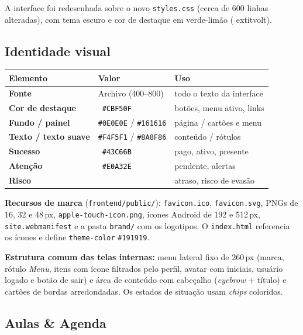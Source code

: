 \documentclass[11pt,a4paper]{article}
\newcommand{\cod}[1]{\texttt{#1}}
\begin{document}
A interface foi redesenhada sobre o novo \cod{styles.css} (cerca de 600 linhas alteradas), com
tema escuro e cor de destaque em verde-limão (	extit{volt}).

\subsection{Identidade visual}

\begin{center}
\begin{tabular}{>{\bfseries}l l l}
  \toprule
  Elemento & Valor & Uso \\
  \midrule
  Fonte                 & Archivo (400--800)                 & todo o texto da interface \\
  Cor de destaque       & \colorbox[HTML]{CBF50F}{\textcolor{black}{\ \cod{\#CBF50F}\ }} & botões, menu ativo, links \\
  Fundo / painel        & \cod{\#0E0E0E} / \cod{\#161616}    & página / cartões e menu \\
  Texto / texto suave   & \cod{\#F4F5F1} / \cod{\#8A8F86}    & conteúdo / rótulos \\
  Sucesso               & \colorbox[HTML]{43C66B}{\textcolor{black}{\ \cod{\#43C66B}\ }} & pago, ativo, presente \\
  Atenção               & \colorbox[HTML]{E0A32E}{\textcolor{black}{\ \cod{\#E0A32E}\ }} & pendente, alertas \\
  Risco                 & \colorbox[HTML]{F0493C}{\textcolor{white}{\ \cod{\#F0493C}\ }} & atraso, risco de evasão \\
  \bottomrule
\end{tabular}
\end{center}

\textbf{Recursos de marca} (\cod{frontend/public/}): \cod{favicon.ico}, \cod{favicon.svg}, PNGs de
16, 32 e 48\,px, \cod{apple-touch-icon.png}, ícones Android de 192 e 512\,px,
\cod{site.webmanifest} e a pasta \cod{brand/} com os logotipos. O \cod{index.html} referencia os
ícones e define \cod{theme-color} \cod{\#191919}.

\textbf{Estrutura comum das telas internas:} menu lateral fixo de 260\,px (marca, rótulo
\textit{Menu}, itens com ícone filtrados pelo perfil, avatar com iniciais, usuário logado e botão
de sair) e área de conteúdo com cabeçalho (\textit{eyebrow} + título) e cartões de bordas
arredondadas. Os estados de situação usam \textit{chips} coloridos.

\subsection{Aulas \& Agenda}
\end{document}
